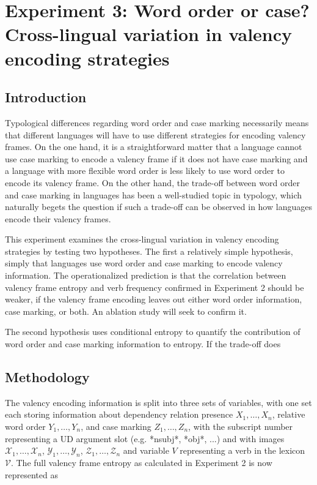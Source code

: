 

\section{Experiment 3: Word order or case? Cross-lingual variation in valency encoding strategies}\label{sec:exp3-ablation}
\subsection{Introduction}

Typological differences regarding word order and case marking necessarily means that different languages will have to use different strategies for encoding valency frames. On the one hand, it is a straightforward matter that a language cannot use case marking to encode a valency frame if it does not have case marking and a language with more flexible word order is less likely to use word order to encode its valency frame. On the other hand, the trade-off between word order and case marking in languages has been a well-studied topic in typology, which naturally begets the question if such a trade-off can be observed in how languages encode their valency frames.

This experiment examines the cross-lingual variation in valency encoding strategies by testing two hypotheses. The first a relatively simple hypothesis, simply that languages use word order and case marking to encode valency information. The operationalized prediction is that the correlation between valency frame entropy and verb frequency confirmed in Experiment 2 should be weaker, if the valency frame encoding leaves out either word order information, case marking, or both. An ablation study will seek to confirm it.

The second hypothesis uses conditional entropy to quantify the contribution of word order and case marking information to entropy. If the trade-off does 

\subsection{Methodology}

The valency encoding information is split into three sets of variables, with one set each storing information about dependency relation presence $X_1,\ldots,X_n$, relative word order $Y_1,\ldots,Y_n$, and case marking $Z_1,\ldots,Z_n$, with the subscript number representing a UD argument slot (e.g. *nsubj*, *obj*, ...) and with images $\mathcal{X}_{1},\ldots,\mathcal{X}_{n}$,  $\mathcal{Y}_{1},\ldots,\mathcal{Y}_{n}$, $\mathcal{Z}_{1},\ldots,\mathcal{Z}_{n}$ and variable $V$ representing a verb in the lexicon $\mathcal{V}$. The full valency frame entropy as calculated in Experiment 2 is now represented as 

